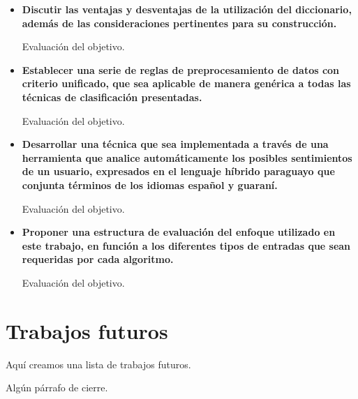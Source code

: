 \begin{itemize}
\item \textbf{Discutir las ventajas y desventajas de la utilizaci\'on del diccionario, adem\'as de las consideraciones pertinentes para su construcci\'on.}
\newline

Evaluaci\'on del objetivo.
\newline

\item \textbf{Establecer una serie de reglas de preprocesamiento de datos con criterio unificado, que sea aplicable de manera gen\'erica a todas las t\'ecnicas de clasificaci\'on presentadas.} 
\newline

Evaluaci\'on del objetivo.
\newline

\item \textbf{Desarrollar una t\'ecnica que sea implementada a trav\'es de una herramienta que analice autom\'aticamente los posibles sentimientos de un usuario, expresados en el lenguaje h\'ibrido paraguayo que conjunta t\'erminos de los idiomas espa\~nol y guaran\'i.}
\newline

Evaluaci\'on del objetivo.
\newline

\item \textbf{Proponer una estructura de evaluaci\'on del enfoque utilizado en este trabajo, en funci\'on a los diferentes tipos de entradas que sean requeridas por cada algoritmo.}
\newline

Evaluaci\'on del objetivo.
\newline
\end{itemize}

\section{Trabajos futuros}

Aqu\'i creamos una lista de trabajos futuros.
\newline

Alg\'un p\'arrafo de cierre.